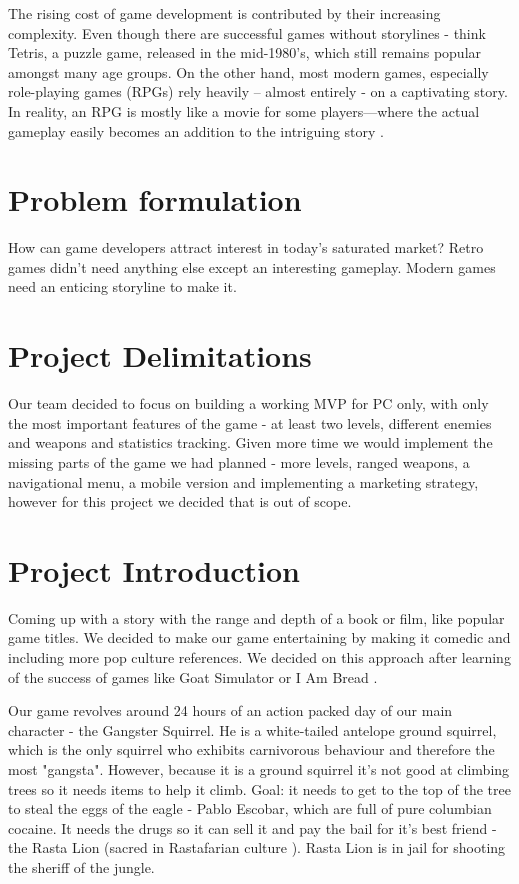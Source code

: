 \documentclass[12p]{article}
\begin{document}
The rising cost of game development is contributed by their increasing complexity. Even though there are successful games without storylines - think Tetris, a puzzle game, released in the mid-1980’s, which still remains popular amongst many age groups. On the other hand, most modern games, especially role-playing games (RPGs) rely heavily – almost entirely - on a captivating story. In reality, an RPG is mostly like a movie for some players—where the actual gameplay easily becomes an addition to the intriguing story \cite{GameDevelopmentEssentials}.

\section{Problem formulation} \label{ProblemFormulation}

How can game developers attract interest in today’s saturated market? Retro games didn’t need anything else except an interesting gameplay. Modern games need an enticing storyline to make it.

\section{Project Delimitations} \label{ProjectDelimitations}

Our team decided to focus on building a working MVP for PC only, with only the most important features of the game - at least two levels, different enemies and weapons and statistics tracking. Given more time we would implement the missing parts of the game we had planned - more levels, ranged weapons, a navigational menu, a mobile version and implementing a marketing strategy, however for this project we decided that is out of scope.

\section{Project Introduction} \label{ProjectIntroduction}

Coming up with a story with the range and depth of a book or film, like popular game titles. We decided to make our game entertaining by making it comedic and including more pop culture references. We decided on this approach after learning of the success of games like Goat Simulator \cite{GoatSimulator} or I Am Bread \cite{IAmBread}.

Our game revolves around 24 hours of an action packed day of our main character - the Gangster Squirrel. He is a white-tailed antelope ground squirrel, which is the only squirrel who exhibits carnivorous behaviour \cite{CarnivorousSquirells} and therefore the most "gangsta". However, because it is a ground squirrel it’s not good at climbing trees so it needs items to help it climb.
Goal: it needs to get to the top of the tree to steal the eggs of the eagle - Pablo Escobar, which are full of pure columbian cocaine. It needs the drugs so it can sell it and pay the bail for it’s best friend - the Rasta Lion (sacred in Rastafarian culture \cite{RastaLion}). Rasta Lion is in jail for shooting the sheriff \cite{Sheriff} of the jungle.
\end{document}

